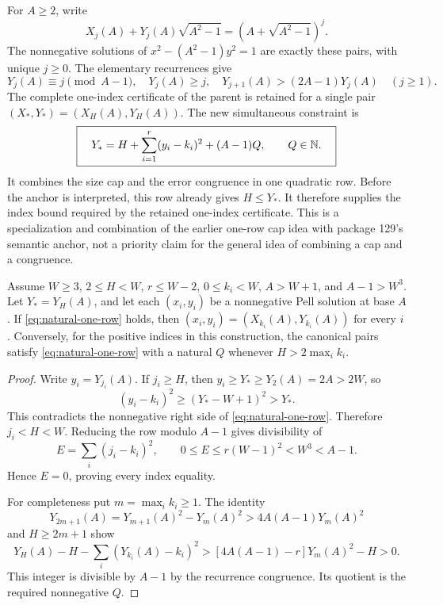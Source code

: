 For \(A\ge2\), write
\[
 X_j(A)+Y_j(A)\sqrt{A^2-1}=(A+\sqrt{A^2-1})^j.
\]
The nonnegative solutions of
\(x^2-(A^2-1)y^2=1\) are exactly these pairs, with unique \(j\ge0\).
The elementary recurrences give
\[
 Y_j(A)\equiv j\pmod{A-1},\quad Y_j(A)\ge j,\quad
 Y_{j+1}(A)>(2A-1)Y_j(A)\quad(j\ge1).
\]
The complete one-index certificate of the parent is retained for a
single pair \((X_*,Y_*)=(X_H(A),Y_H(A))\). The new simultaneous
constraint is
\begin{equation}\label{eq:natural-one-row}
 \boxed{\quad
 Y_*=H+\sum_{i=1}^{r}(y_i-k_i)^2+(A-1)Q,
 \qquad Q\in\mathbb N.\quad}
\end{equation}
It combines the size cap and the error congruence in one quadratic row.
Before the anchor is interpreted, this row already gives \(H\le Y_*\).
It therefore supplies the index bound required by the retained
one-index certificate.
This is a specialization and combination of the earlier one-row cap
idea \cite{cap128} with package 129's semantic anchor, not a priority
claim for the general idea of combining a cap and a congruence.

\begin{lemma}\label{lem:natural-cap}
Assume \(W\ge3\), \(2\le H<W\), \(r\le W-2\),
\(0\le k_i<W\), \(A>W+1\), and \(A-1>W^3\).
Let \(Y_*=Y_H(A)\), and let each \((x_i,y_i)\) be a
nonnegative Pell solution at base \(A\). If
\eqref{eq:natural-one-row} holds, then
\((x_i,y_i)=(X_{k_i}(A),Y_{k_i}(A))\) for every \(i\).
Conversely, for the positive indices in this construction, the
canonical pairs satisfy \eqref{eq:natural-one-row} with a natural
\(Q\) whenever \(H>2\max_i k_i\).
\end{lemma}

\begin{proof}
Write \(y_i=Y_{j_i}(A)\). If \(j_i\ge H\), then
\(y_i\ge Y_*\ge Y_2(A)=2A>2W\), so
\[
 (y_i-k_i)^2\ge(Y_*-W+1)^2>Y_*.
\]
This contradicts the nonnegative right side of
\eqref{eq:natural-one-row}. Therefore \(j_i<H<W\).
Reducing the row modulo \(A-1\) gives divisibility of
\[
 E=\sum_i(j_i-k_i)^2,
 \qquad 0\le E\le r(W-1)^2<W^3<A-1.
\]
Hence \(E=0\), proving every index equality.

For completeness put \(m=\max_i k_i\ge1\). The identity
\[
 Y_{2m+1}(A)=Y_{m+1}(A)^2-Y_m(A)^2
            >4A(A-1)Y_m(A)^2
\]
and \(H\ge2m+1\) show
\[
 Y_H(A)-H-\sum_i(Y_{k_i}(A)-k_i)^2
 >[4A(A-1)-r]Y_m(A)^2-H>0.
\]
This integer is divisible by \(A-1\) by the recurrence congruence.
Its quotient is the required nonnegative \(Q\).
\end{proof}

